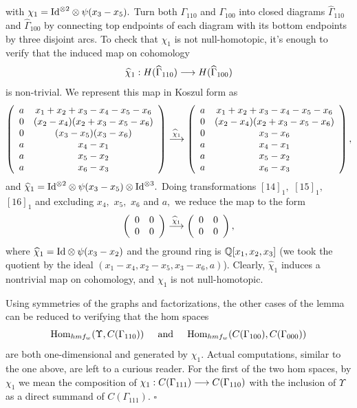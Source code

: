 \documentclass[12pt]{article}
\begin{document}
with $\chi_1=\mathrm{Id}^{\otimes 2}\otimes \psi(x_3-x_5).$ 
Turn both $\Gamma_{110}$ and $\Gamma_{100}$ into closed 
diagrams $\widehat{\Gamma}_{110}$ and $\widehat{\Gamma}_{100}$
by connecting top endpoints of each diagram with its bottom endpoints
by three disjoint arcs. To check that $\chi_1$ is not null-homotopic, 
it's enough to verify that the induced map on cohomology 
$$\widehat{\chi}_1: H(\widehat{\Gamma}_{110}) \longrightarrow 
  H(\widehat{\Gamma}_{100})$$
is non-trivial. We represent this map in Koszul form as 
$$ \left( \begin{array}{cc} a & x_1+x_2+x_3-x_4-x_5-x_6  \\ 
  0 & (x_2-x_4)(x_2+x_3-x_5-x_6)  \\
  0 & (x_3-x_5)(x_3-x_6) \\
  a & x_4 -x_1 \\
  a & x_5 -x_2 \\
  a & x_6 -x_3 \end{array} \right) \stackrel{\widehat{\chi}_1}{\longrightarrow} 
  \left( \begin{array}{cc} a & x_1+x_2+x_3-x_4-x_5-x_6  \\ 
  0 & (x_2-x_4)(x_2+x_3-x_5-x_6)  \\
  0 & x_3-x_6   \\
  a & x_4 -x_1 \\
  a & x_5 -x_2 \\
  a & x_6 -x_3
 \end{array} \right), $$ 
and $\widehat{\chi}_1= \mathrm{Id}^{\otimes 2}\otimes \psi(x_3-x_5) \otimes 
\mathrm{Id}^{\otimes 3}.$ Doing transformations $[14]_1,$ $[15]_1,$ $[16]_1$ 
and excluding $x_4,$ $x_5,$ $x_6$ and $a,$ we reduce the map 
to the form 
$$ \left( \begin{array}{cc} 0 & 0 \\
  0 & 0 
 \end{array} \right) \stackrel{\widehat{\chi}_1}{\longrightarrow} 
  \left( \begin{array}{cc} 0 & 0 \\
  0 & 0
 \end{array} \right), $$ 
where $\widehat{\chi}_1= \mathrm{Id} \otimes \psi(x_3-x_2)$ and the ground 
ring is $\mathbb Q[x_1,x_2,x_3]$ (we took the quotient by the 
ideal $(x_1-x_4, x_2-x_5, x_3-x_6,a)$). Clearly, 
$\widehat{\chi}_1$ induces a nontrivial map on 
cohomology, and $\chi_1$ is not null-homotopic.  

\vspace{0.06in} 

Using symmetries of the graphs and factorizations, the other 
cases of the lemma can be reduced to verifying that the hom spaces 
$$\mathrm{Hom}_{hmf_w}(\Upsilon, C(\Gamma_{110}))\hspace{0.2in} \mathrm{and}
\hspace{0.2in}\mathrm{Hom}_{hmf_w}(C(\Gamma_{100}), C(\Gamma_{000}))$$
are both one-dimensional and generated by $\chi_1.$ 
Actual computations, similar to the 
one above, are left to a curious reader. For the first of the 
two hom spaces, by $\chi_1$ we mean the composition of 
$\chi_1: C(\Gamma_{111}) \longrightarrow C(\Gamma_{110})$ 
with the inclusion of $\Upsilon$ as a direct 
summand of $C(\Gamma_{111}).$ 
$\square$ 
\end{document}
